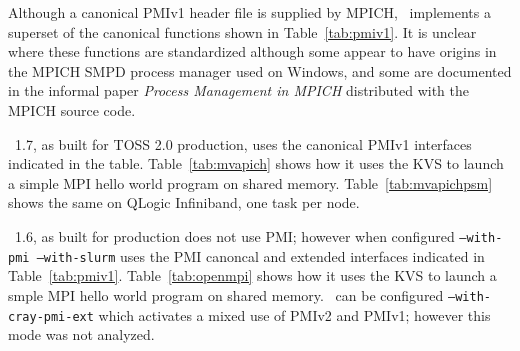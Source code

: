 Although a canonical PMIv1 header file is supplied by MPICH,
\slurm\ implements a superset of the canonical functions shown in
Table~\ref{tab:pmiv1}.  It is unclear where these functions are
standardized although some appear to have origins in the MPICH
SMPD process manager used on Windows, and some are documented in
the informal paper {\em Process Management in MPICH} distributed
with the MPICH source code.

\ 1.7, as built for TOSS 2.0 production, uses the canonical
PMIv1 interfaces indicated in the table.
Table~\ref{tab:mvapich} shows how it uses the KVS to launch a simple MPI
hello world program on shared memory.
Table~\ref{tab:mvapichpsm} shows the same on QLogic Infiniband, one task
per node.

\openmpi\ 1.6, as built for production does not use PMI;
however when configured {\tt --with-pmi --with-slurm} uses the 
PMI canoncal and extended interfaces indicated in Table~\ref{tab:pmiv1}.
Table~\ref{tab:openmpi} shows how it uses the KVS to launch a smple MPI
hello world program on shared memory.
\openmpi\ can be configured {\tt --with-cray-pmi-ext} which
activates a mixed use of PMIv2 and PMIv1; however this mode was not analyzed.

